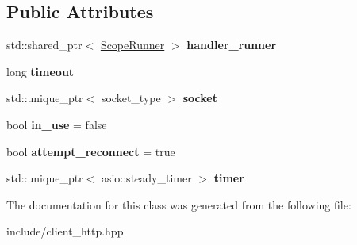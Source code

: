 \subsection*{Public Attributes}
\begin{DoxyCompactItemize}
\item 
std\+::shared\+\_\+ptr$<$ \hyperlink{classSimpleWeb_1_1ScopeRunner}{Scope\+Runner} $>$ {\bfseries handler\+\_\+runner}\hypertarget{classSimpleWeb_1_1ClientBase_1_1Connection_aeb1c89528e3c1f30760ea8dbe3b2dce2}{}\label{classSimpleWeb_1_1ClientBase_1_1Connection_aeb1c89528e3c1f30760ea8dbe3b2dce2}

\item 
long {\bfseries timeout}\hypertarget{classSimpleWeb_1_1ClientBase_1_1Connection_af10eb147c9b1b5c64afb6694ed80ee7e}{}\label{classSimpleWeb_1_1ClientBase_1_1Connection_af10eb147c9b1b5c64afb6694ed80ee7e}

\item 
std\+::unique\+\_\+ptr$<$ socket\+\_\+type $>$ {\bfseries socket}\hypertarget{classSimpleWeb_1_1ClientBase_1_1Connection_a80d4914aec3181687347a5e7f611fd04}{}\label{classSimpleWeb_1_1ClientBase_1_1Connection_a80d4914aec3181687347a5e7f611fd04}

\item 
bool {\bfseries in\+\_\+use} = false\hypertarget{classSimpleWeb_1_1ClientBase_1_1Connection_a81c67425861c87ca917d6c7084c16c30}{}\label{classSimpleWeb_1_1ClientBase_1_1Connection_a81c67425861c87ca917d6c7084c16c30}

\item 
bool {\bfseries attempt\+\_\+reconnect} = true\hypertarget{classSimpleWeb_1_1ClientBase_1_1Connection_aa0ada906594a657b969fb078ee936bdc}{}\label{classSimpleWeb_1_1ClientBase_1_1Connection_aa0ada906594a657b969fb078ee936bdc}

\item 
std\+::unique\+\_\+ptr$<$ asio\+::steady\+\_\+timer $>$ {\bfseries timer}\hypertarget{classSimpleWeb_1_1ClientBase_1_1Connection_a779667a7de45586f8c3bdee0454312c6}{}\label{classSimpleWeb_1_1ClientBase_1_1Connection_a779667a7de45586f8c3bdee0454312c6}

\end{DoxyCompactItemize}


The documentation for this class was generated from the following file\+:\begin{DoxyCompactItemize}
\item 
include/client\+\_\+http.\+hpp\end{DoxyCompactItemize}
